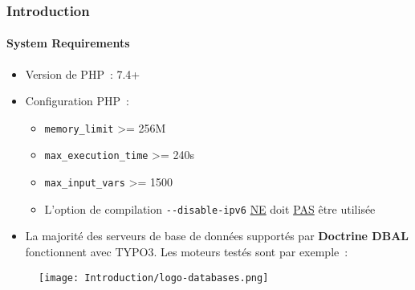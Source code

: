 %

\begin{frame}[fragile]
	\frametitle{Introduction}
	\framesubtitle{System Requirements}

	\begin{itemize}
		\item Version de PHP~: 7.4+
		\item Configuration PHP~:

			\begin{itemize}
				\item \texttt{memory\_limit} >= 256M
				\item \texttt{max\_execution\_time} >= 240s
				\item \texttt{max\_input\_vars} >= 1500
				\item L'option de compilation \texttt{-}\texttt{-disable-ipv6}
				\underline{NE} doit \underline{PAS} être utilisée
			\end{itemize}

		\item La majorité des serveurs de base de données supportés par \textbf{Doctrine DBAL}
			fonctionnent avec TYPO3. Les moteurs testés sont par exemple~:
	\end{itemize}

	\begin{figure}
		\texttt{[image: Introduction/logo-databases.png]}
	\end{figure}

\end{frame}

